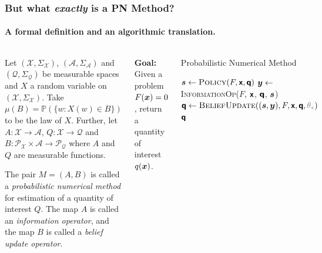 \documentclass[10pt,usepdftitle=false,aspectratio=169]{beamer}
\begin{document}
\begin{frame}\frametitle{But what \textit{exactly} is a PN Method?}
	\framesubtitle{A formal definition and an algorithmic translation.}

	\begin{columns}[totalwidth=\textwidth]

		\begin{definition}
			Let \((\mathcal{X}, \Sigma_\mathcal{X})\),
			\((\mathcal{A}, \Sigma_\mathcal{A})\) and \((\mathcal{Q},
			\Sigma_\mathcal{Q})\) be measurable spaces and \(X\) a random variable on
			\((\mathcal{X}, \Sigma_\mathcal{X})\). Take
			\(\mu(B)=\mathbb{P}(\{w : X(w) \in B\})\) to be the law of \(X\). Further, let
			\(A:\mathcal{X} \rightarrow \mathcal{A}\), \(Q: \mathcal{X}
			\rightarrow \mathcal{Q}\) and \(B: \mathcal{P}_\mathcal{X} \times
			\mathcal{A} \rightarrow \mathcal{P}_\mathcal{Q}\) where \(A\) and
			\(Q\) are measurable functions.
			\vspace{1.5ex}

			The pair \(M=(A,B)\) is called a \emph{probabilistic numerical method} for estimation of a quantity of interest
			\(Q\). The map \(A\) is called an \emph{information operator}, and the map \(B\) is called a
			\emph{belief update operator}.
		\end{definition}



		\textbf{Goal:} Given a problem \(F({\bm{x}}) = 0\), return a quantity of interest \(q({\bm{x}})\).

		\setcounter{algorithm}{0}
		\begin{algorithm}[H]
			\caption{Probabilistic Numerical Method}
			\small
			\begin{algorithmic}[1]
				\State \({{\bm{s}}} \gets \textsc{Policy}(F, {\bm{\mathsf{x}}}, {\bm{\mathsf{q}}})\)
				\State \({{\bm{y}}} \gets\) \textsc{InformationOp}($F$, ${\bm{\mathsf{x}}}$, ${\bm{\mathsf{q}}}$, ${\bm{s}}$)
				\State \(\rvq \gets \textsc{BeliefUpdate}((\vs, \vy), F, \rvx, \rvq,
				{\color{gray}\theta_*})\)
				\EndWhile
				\State \Return ${\bm{\mathsf{q}}}$
				\EndProcedure
			\end{algorithmic}
		\end{algorithm}

	\end{columns}

	\vspace{1.5em}


\end{frame}
\end{document}
